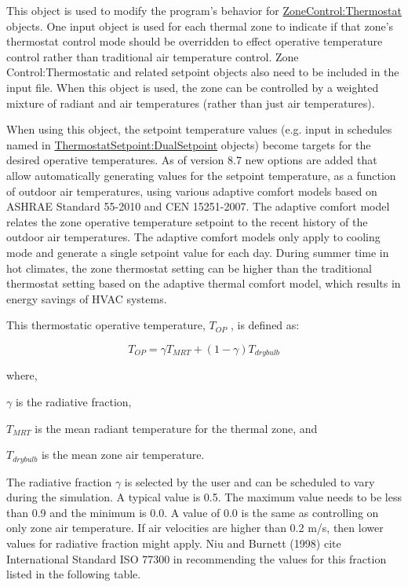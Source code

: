 This object is used to modify the program's behavior for \hyperref[zonecontrolthermostat]{ZoneControl:Thermostat} objects. One input object is used for each thermal zone to indicate if that zone's thermostat control mode should be overridden to effect operative temperature control rather than traditional air temperature control. Zone Control:Thermostatic and related setpoint objects also need to be included in the input file. When this object is used, the zone can be controlled by a weighted mixture of radiant and air temperatures (rather than just air temperatures).

When using this object, the setpoint temperature values (e.g. input in schedules named in \hyperref[thermostatsetpointdualsetpoint]{ThermostatSetpoint:DualSetpoint} objects) become targets for the desired operative temperatures. As of version 8.7 new options are added that allow automatically generating values for the setpoint temperature, as a function of outdoor air temperatures, using various adaptive comfort models based on ASHRAE Standard 55-2010 and CEN 15251-2007. The adaptive comfort model relates the zone operative temperature setpoint to the recent history of the outdoor air temperatures.  The adaptive comfort models only apply to cooling mode and generate a single setpoint value for each day. During summer time in hot climates, the zone thermostat setting can be higher than the traditional thermostat setting based on the adaptive thermal comfort model, which results in energy savings of HVAC systems.

This thermostatic operative temperature, \({T_{OP}}\) , is defined as:

\begin{equation}
{T_{OP}} = \gamma {T_{MRT}} + (1 - \gamma ){T_{drybulb}}
\end{equation}

where,

\(\gamma\) is the radiative fraction,

\({T_{MRT}}\) is the mean radiant temperature for the thermal zone, and

\({T_{drybulb}}\) is the mean zone air temperature.

The radiative fraction \(\gamma\) is selected by the user and can be scheduled to vary during the simulation. A typical value is 0.5. The maximum value needs to be less than 0.9 and the minimum is 0.0. A value of 0.0 is the same as controlling on only zone air temperature. If air velocities are higher than 0.2 m/s, then lower values for radiative fraction might apply. Niu and Burnett (1998) cite International Standard ISO 77300 in recommending the values for this fraction listed in the following table.


